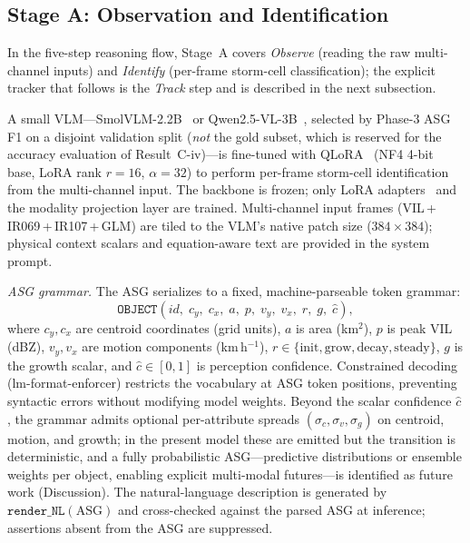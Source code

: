 \documentclass[fleqn,10pt]{wlscirep}
\begin{document}
\subsection*{Stage A: Observation and Identification}

In the five-step reasoning flow, Stage~A covers \emph{Observe} (reading the raw multi-channel inputs) and \emph{Identify} (per-frame storm-cell classification); the explicit tracker that follows is the \emph{Track} step and is described in the next subsection.

A small VLM---SmolVLM-2.2B~\cite{marafioti2025smolvlm} or Qwen2.5-VL-3B~\cite{bai2025qwen25vl}, selected by Phase-3 ASG F1 on a disjoint validation split (\emph{not} the gold subset, which is reserved for the accuracy evaluation of Result~C-iv)---is fine-tuned with QLoRA~\cite{dettmers2023qlora} (NF4 4-bit base, LoRA rank $r=16$, $\alpha=32$) to perform per-frame storm-cell identification from the multi-channel input.
The backbone is frozen; only LoRA adapters~\cite{hu2022lora} and the modality projection layer are trained.
Multi-channel input frames (VIL\,+\,IR069\,+\,IR107\,+\,GLM) are tiled to the VLM's native patch size ($384{\times}384$); physical context scalars and equation-aware text are provided in the system prompt.

\textit{ASG grammar.}
The ASG serializes to a fixed, machine-parseable token grammar:
\[
\texttt{OBJECT}(id,\; c_y,\; c_x,\; a,\; p,\; v_y,\; v_x,\; r,\; g,\; \hat{c}),
\]
where $c_y, c_x$ are centroid coordinates (grid units), $a$ is area (km$^2$), $p$ is peak VIL (dBZ), $v_y, v_x$ are motion components (km\,h$^{-1}$), $r\in\{\text{init},\text{grow},\text{decay},\text{steady}\}$, $g$ is the growth scalar, and $\hat{c}\in[0,1]$ is perception confidence.
Constrained decoding (lm-format-enforcer) restricts the vocabulary at ASG token positions, preventing syntactic errors without modifying model weights.
Beyond the scalar confidence $\hat{c}$, the grammar admits optional per-attribute spreads $(\sigma_{c},\sigma_{v},\sigma_{g})$ on centroid, motion, and growth; in the present model these are emitted but the transition is deterministic, and a fully probabilistic ASG---predictive distributions or ensemble weights per object, enabling explicit multi-modal futures---is identified as future work (Discussion).
The natural-language description is generated by $\texttt{render\_NL}(\text{ASG})$ and cross-checked against the parsed ASG at inference; assertions absent from the ASG are suppressed.
\end{document}
